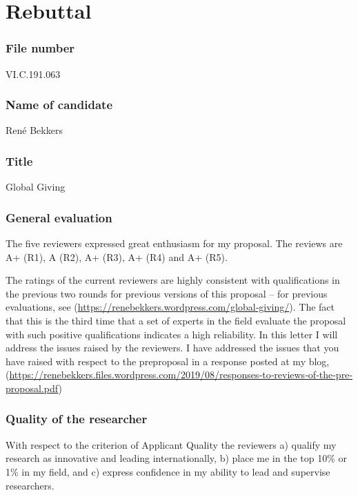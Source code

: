 \documentclass[twocolumn, serif, rga, numeric]{jote-article}
\begin{document}
 {}\section*{Rebuttal} 
 {}\subsubsection*{File number} 
VI.C.191.063
 {}\subsubsection*{Name of candidate} 
René Bekkers
 {}\subsubsection*{Title} 
Global Giving
 {}\subsubsection*{General evaluation} 
The five reviewers expressed great enthusiasm for my proposal. The reviews are A+ (R1), A (R2), A+ (R3), A+ (R4) and A+ (R5).

The ratings of the current reviewers are highly consistent with qualifications in the previous two rounds for previous versions of this proposal – for previous evaluations, see (\href{https://renebekkers.wordpress.com/global‐giving/}{https://renebekkers.wordpress.com/global‐giving/}). The fact that this is the third time that a set of experts in the field evaluate the proposal with such positive qualifications indicates a high reliability.
In this letter I will address the issues raised by the reviewers. I have addressed the issues that you have raised with respect to the preproposal in a response posted at my blog, (\href{https://renebekkers.files.wordpress.com/2019/08/responses‐to‐reviews‐of‐the‐pre‐proposal.pdf}{https://renebekkers.files.wordpress.com/2019/08/responses‐to‐reviews‐of‐the‐pre‐proposal.pdf})
 {}\subsubsection*{Quality of the researcher} 
With respect to the criterion of Applicant Quality the reviewers a) qualify my research as innovative and leading internationally, b) place me in the top 10\% or 1\% in my field, and c) express confidence in my ability to lead and supervise researchers.
\end{document}
